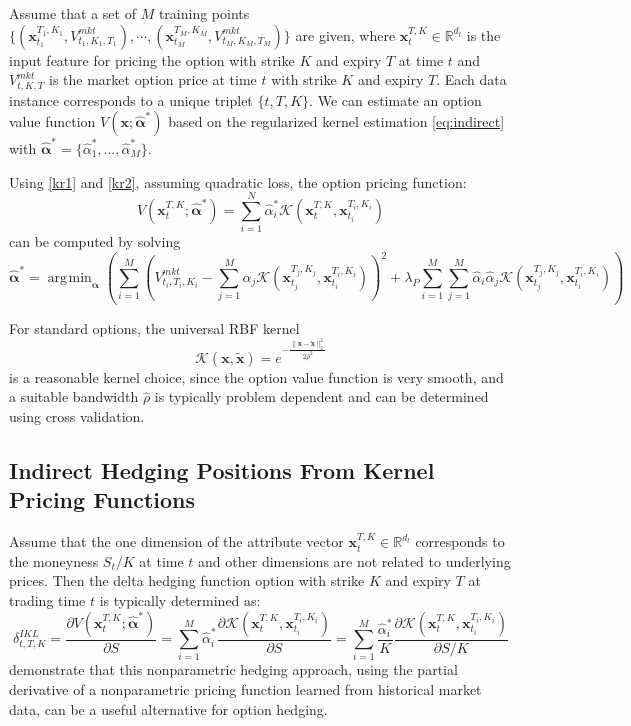 \documentclass[letterpaper,12pt,titlepage,oneside,final]{book}
\numberwithin{equation}{section}
\theoremstyle{definition}
\newcommand{\vx}{\mathbf{x}}
\newcommand{\Real}{\mathbb{R}}
\DeclareMathOperator*{\argmin}{\arg\!\min}
\newcommand{\valpha}{\pmb{\widehat{\alpha}}}
\newcommand{\Vmkt}{V^{mkt}}
\begin{document}
Assume that a set of $M$ training points $
 \{ (\vx_{t_1}^{T_1,K_1},V^{mkt}_{t_1,K_1,T_1}), \cdots, (\vx_{t_M}^{T_M,K_M},V^{mkt}_{t_M,K_M,T_M})\} $ are given, where
$
\vx_{t}^{T,K}  \in \Real^{d_l}
$ is the input feature for pricing the option with strike $K$ and expiry $T$ at time $t$ and  $V^{mkt}_{t,K,T}$ is the market option price at time $t$ with strike $K$ and expiry $T$.  Each data instance corresponds to a unique triplet $\{t,T,K\}$.
We can estimate an option value function $V(\vx;{\valpha}^*)$ based on the regularized kernel estimation \eqref{eq:indirect} with $\valpha^*=\{\widehat{\alpha}^*_1,\dots,\widehat{\alpha}^*_M\}$.


Using \eqref{kr1} and \eqref{kr2}, assuming quadratic loss, the option pricing function:
\begin{equation}
	V(\vx_{t}^{T,K};\mathbf{{\valpha}^*})=\sum_{i=1}^N \widehat{\alpha}^*_i \mathcal{K}(\vx_{t}^{T,K},\vx_{t_i}^{T_i,K_i})
	\label{eq:KernelRep}
\end{equation} can be computed by solving
\begin{equation}
	{\valpha}^*=\argmin_{\mathbf{{\alpha}}} \left(  \sum_{i=1}^M \left( \Vmkt_{t_i,T_i,K_i}-\sum_{j=1}^M \widehat{\alpha}_j \mathcal{K}(\vx_{t_j}^{T_j,K_j},\vx_{t_i}^{T_i,K_i}) \right)^2+\lambda_P \sum_{i=1}^M\sum_{j=1}^M  \widehat{\alpha}_i \widehat{\alpha}_j \mathcal{K}(\vx_{t_j}^{T_j,K_j},\vx_{t_i}^{T_i,K_i})\right)
\label{eq:indirectf}
\end{equation}


For standard options, the universal RBF kernel
\begin{equation} \label{eq:RBF}
\mathcal{K}(\vx,\tilde{\vx})=e^{-\frac{\|\vx-\tilde{\vx}\|_2^2}{2 \hat{\rho}^2}}
\end{equation}
is a reasonable kernel choice, since the option value function is very smooth, and
a suitable bandwidth $\hat{\rho}$ is typically problem dependent and can be determined using cross validation.


\subsection{Indirect Hedging Positions From Kernel Pricing Functions} \label{sec:VF}

Assume that the one dimension  of the attribute vector $\vx_{t}^{T,K} \in \Real^{d_l}$ corresponds to the moneyness $S_t/K$ at time $t$ and other dimensions are not related to underlying prices. Then the delta hedging function option with strike $K$ and expiry $T$ at trading time $t$ is typically determined as:
\begin{equation}\label{eq:dV}
	\delta^{IKL}_{t,T,K}=
\frac{\partial V(\mathbf{x}_{t}^{T,K};\valpha^*)}{\partial S}=\sum_{i=1}^M  \widehat{\alpha}^*_i\frac{\partial \mathcal{K}(\mathbf{x}_{t}^{T,K},\vx_{t_i}^{T_i,K_i})}{\partial S} = \sum_{i=1}^M  \frac{\widehat{\alpha}^*_i}{K} \frac{\partial \mathcal{K}(\mathbf{x}_{t}^{T,K},\vx_{t_i}^{T_i,K_i})}{\partial S/K} 
\end{equation}
\citet{hutchinson} demonstrate that this nonparametric hedging approach,  using the partial derivative of a nonparametric pricing function learned from historical market data, can be a useful alternative for option hedging.
\end{document}
